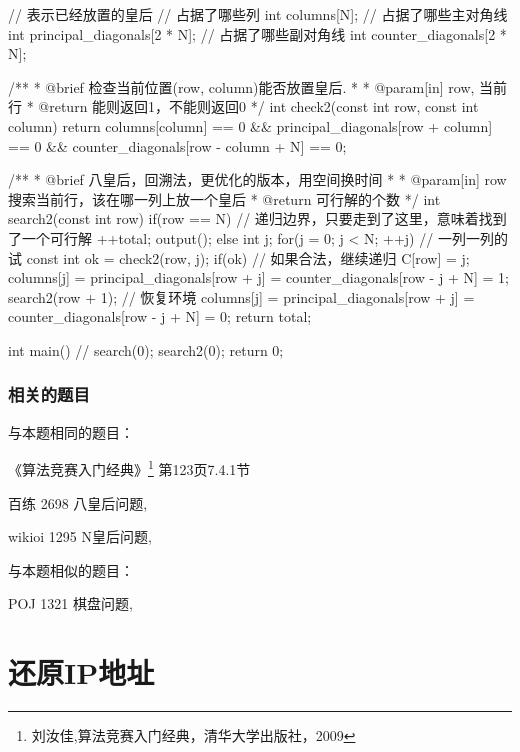\begin{Codex}[label=eight_queen.c]
// 表示已经放置的皇后
// 占据了哪些列
int columns[N];
// 占据了哪些主对角线
int principal_diagonals[2 * N];
// 占据了哪些副对角线
int counter_diagonals[2 * N];

/**
 * @brief 检查当前位置(row, column)能否放置皇后.
 *
 * @param[in] row, 当前行
 * @return 能则返回1，不能则返回0
 */
int check2(const int row, const int column) {
    return columns[column] == 0 && principal_diagonals[row + column] == 0
        && counter_diagonals[row - column + N] == 0;
}

/**
 * @brief 八皇后，回溯法，更优化的版本，用空间换时间
 *
 * @param[in] row 搜索当前行，该在哪一列上放一个皇后
 * @return 可行解的个数
 */
int search2(const int row) {
    if(row == N) {  // 递归边界，只要走到了这里，意味着找到了一个可行解
        ++total;
        output();
    } else {
        int j;
        for(j = 0; j < N; ++j) {  // 一列一列的试
            const int ok = check2(row, j);
            if(ok) {  // 如果合法，继续递归
                C[row] = j;
                columns[j] = principal_diagonals[row + j] =
                    counter_diagonals[row - j + N] = 1;
                search2(row + 1);
                // 恢复环境
                columns[j] = principal_diagonals[row + j] =
                    counter_diagonals[row - j + N] = 0;
            }
        }
    }
    return total;
}

int main() {
    // search(0);
    search2(0);
    return 0;
}
\end{Codex}

\subsubsection{相关的题目}
与本题相同的题目：
\begindot
\item 《算法竞赛入门经典》\footnote{刘汝佳,算法竞赛入门经典，清华大学出版社，2009} 第123页7.4.1节
\item 百练 2698 八皇后问题, 
\item wikioi 1295 N皇后问题, 
\myenddot

与本题相似的题目：
\begindot
\item POJ 1321 棋盘问题, 
\myenddot


\section{还原IP地址} %

